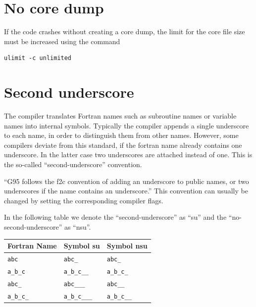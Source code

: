 \documentclass[a4paper,10pt]{report}
\begin{document}
\section{No core dump}
If the code crashes without creating a core dump,
the limit for the core file size must be increased using the command
\begin{verbatim}
ulimit -c unlimited
\end{verbatim}

\section{Second underscore}
The compiler translates Fortran names such as subroutine names or
variable names into internal symbols. Typically the compiler appends a
single underscore to each name, in order to distinguish them from
other names. However, some compilers deviate from this standard, if
the fortran name already contains one underscore. In the latter case
two underscores are attached instead of one. This is the so-called
``second-underscore'' convention.
\begin{center}
``G95 follows the f2c convention of adding an underscore to public
names, or two underscores if the name contains an underscore.'' This
convention can usually be changed by setting the corresponding
compiler flags.
\end{center}

In the following table we denote the ``second-underscore'' as ``su''
and the ``no-second-underscore'' as ``nsu''.
\begin{center}
\begin{tabular}{|l|l|l|}
\hline
Fortran Name & Symbol su & Symbol nsu\\
\hline
\verb+abc+ & \verb+abc_+ &\verb+abc_+\\
\verb+a_b_c+ & \verb+a_b_c__+& \verb+a_b_c_+\\
\verb+abc_+ & \verb+abc___+& \verb+abc__+ \\
\verb+a_b_c_+ & \verb+a_b_c___+& \verb+a_b_c__+\\
\hline
\end{tabular}
\end{center}
\end{document}
